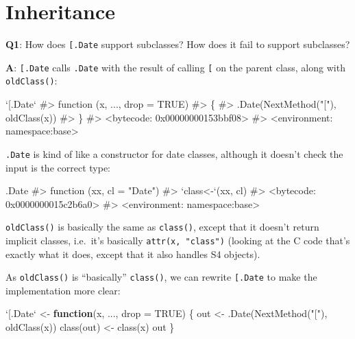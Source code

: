 \documentclass[
]{krantz}
\makeatletter
\newenvironment{Shaded}{\begin{snugshade}}{\end{snugshade}}
\newcommand{\CommentTok}[1]{\textcolor[rgb]{0.56,0.35,0.01}{\textit{#1}}}
\newcommand{\ControlFlowTok}[1]{\textcolor[rgb]{0.13,0.29,0.53}{\textbf{#1}}}
\newcommand{\DataTypeTok}[1]{\textcolor[rgb]{0.13,0.29,0.53}{#1}}
\newcommand{\KeywordTok}[1]{\textcolor[rgb]{0.13,0.29,0.53}{\textbf{#1}}}
\newcommand{\NormalTok}[1]{#1}
\newcommand{\OtherTok}[1]{\textcolor[rgb]{0.56,0.35,0.01}{#1}}
\newcommand{\StringTok}[1]{\textcolor[rgb]{0.31,0.60,0.02}{#1}}
\newenvironment{kframe}{%
\medskip{}
\setlength{\fboxsep}{.8em}
 \def\at@end@of@kframe{}%
 \ifinner\ifhmode%
  \def\at@end@of@kframe{\end{minipage}}%
  \begin{minipage}{\columnwidth}%
 \fi\fi%
 \def\FrameCommand##1{\hskip\@totalleftmargin \hskip-\fboxsep
 \colorbox{shadecolor}{##1}\hskip-\fboxsep
     \hskip-\linewidth \hskip-\@totalleftmargin \hskip\columnwidth}%
 \MakeFramed {\advance\hsize-\width
   \@totalleftmargin\z@ \linewidth\hsize
   \@setminipage}}%
 {\par\unskip\endMakeFramed%
 \at@end@of@kframe}
\renewenvironment{Shaded}{\begin{kframe}}{\end{kframe}}
\renewcommand{\KeywordTok} [1]{\textcolor[rgb]{0.00,0.44,0.13}{{#1}}}
\renewcommand{\DataTypeTok}[1]{\textcolor[rgb]{0.56,0.13,0.00}{{#1}}}
\renewcommand{\StringTok}  [1]{\textcolor[rgb]{0.25,0.44,0.63}{{#1}}}
\renewcommand{\CommentTok} [1]{\textcolor[rgb]{0.38,0.63,0.69}{{#1}}}
\renewcommand{\OtherTok}   [1]{\textcolor[rgb]{0.00,0.44,0.13}{{#1}}}
\renewcommand{\NormalTok}  [1]{{#1}}
\makeatother
\begin{document}
\hypertarget{inheritance}{%
\section{Inheritance}\label{inheritance}}

\textbf{{Q1}}: How does \texttt{{[}.Date} support subclasses? How does it fail to support subclasses?

\textbf{{A}}: \texttt{{[}.Date} calls \texttt{.Date} with the result of calling \texttt{{[}} on the parent class, along with \texttt{oldClass()}:

\begin{Shaded}
\begin{Highlighting}[]
\StringTok{`}\DataTypeTok{[.Date}\StringTok{`}
\CommentTok{#> function (x, ..., drop = TRUE) }
\CommentTok{#> \{}
\CommentTok{#>     .Date(NextMethod("["), oldClass(x))}
\CommentTok{#> \}}
\CommentTok{#> <bytecode: 0x00000000153bbf08>}
\CommentTok{#> <environment: namespace:base>}
\end{Highlighting}
\end{Shaded}

\texttt{.Date} is kind of like a constructor for date classes, although it doesn't check the input is the correct type:

\begin{Shaded}
\begin{Highlighting}[]
\NormalTok{.Date}
\CommentTok{#> function (xx, cl = "Date") }
\CommentTok{#> `class<-`(xx, cl)}
\CommentTok{#> <bytecode: 0x0000000015c2b6a0>}
\CommentTok{#> <environment: namespace:base>}
\end{Highlighting}
\end{Shaded}

\texttt{oldClass()} is basically the same as \texttt{class()}, except that it doesn't return implicit classes, i.e.~it's basically \texttt{attr(x,\ "class")} (looking at the C code that's exactly what it does, except that it also handles S4 objects).

As \texttt{oldClass()} is ``basically'' \texttt{class()}, we can rewrite \texttt{{[}.Date} to make the implementation more clear:

\begin{Shaded}
\begin{Highlighting}[]
\StringTok{`}\DataTypeTok{[.Date}\StringTok{`}\NormalTok{ <-}\StringTok{ }\ControlFlowTok{function}\NormalTok{(x, ..., }\DataTypeTok{drop =} \OtherTok{TRUE}\NormalTok{) \{}
\NormalTok{  out <-}\StringTok{ }\KeywordTok{.Date}\NormalTok{(}\KeywordTok{NextMethod}\NormalTok{(}\StringTok{"["}\NormalTok{), }\KeywordTok{oldClass}\NormalTok{(x))}
  \KeywordTok{class}\NormalTok{(out) <-}\StringTok{ }\KeywordTok{class}\NormalTok{(x)}
\NormalTok{  out}
\NormalTok{\}}
\end{Highlighting}
\end{Shaded}
\end{document}

